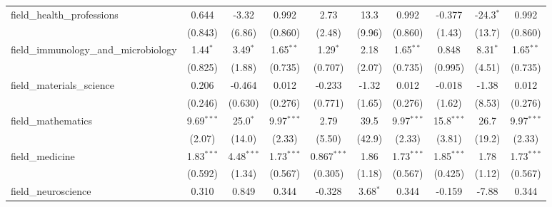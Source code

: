 \begin{tabular}{lccccccccc}
   field\_health\_professions                                  & 0.644          & -3.32          & 0.992          & 2.73           & 13.3           & 0.992          & -0.377         & -24.3$^{*}$    & 0.992\\   
                                                               & (0.843)        & (6.86)         & (0.860)        & (2.48)         & (9.96)         & (0.860)        & (1.43)         & (13.7)         & (0.860)\\   
   field\_immunology\_and\_microbiology                        & 1.44$^{*}$     & 3.49$^{*}$     & 1.65$^{**}$    & 1.29$^{*}$     & 2.18           & 1.65$^{**}$    & 0.848          & 8.31$^{*}$     & 1.65$^{**}$\\   
                                                               & (0.825)        & (1.88)         & (0.735)        & (0.707)        & (2.07)         & (0.735)        & (0.995)        & (4.51)         & (0.735)\\   
   field\_materials\_science                                   & 0.206          & -0.464         & 0.012          & -0.233         & -1.32          & 0.012          & -0.018         & -1.38          & 0.012\\   
                                                               & (0.246)        & (0.630)        & (0.276)        & (0.771)        & (1.65)         & (0.276)        & (1.62)         & (8.53)         & (0.276)\\   
   field\_mathematics                                          & 9.69$^{***}$   & 25.0$^{*}$     & 9.97$^{***}$   & 2.79           & 39.5           & 9.97$^{***}$   & 15.8$^{***}$   & 26.7           & 9.97$^{***}$\\   
                                                               & (2.07)         & (14.0)         & (2.33)         & (5.50)         & (42.9)         & (2.33)         & (3.81)         & (19.2)         & (2.33)\\   
   field\_medicine                                             & 1.83$^{***}$   & 4.48$^{***}$   & 1.73$^{***}$   & 0.867$^{***}$  & 1.86           & 1.73$^{***}$   & 1.85$^{***}$   & 1.78           & 1.73$^{***}$\\   
                                                               & (0.592)        & (1.34)         & (0.567)        & (0.305)        & (1.18)         & (0.567)        & (0.425)        & (1.12)         & (0.567)\\   
   field\_neuroscience                                         & 0.310          & 0.849          & 0.344          & -0.328         & 3.68$^{*}$     & 0.344          & -0.159         & -7.88          & 0.344\\   

\end{tabular}
